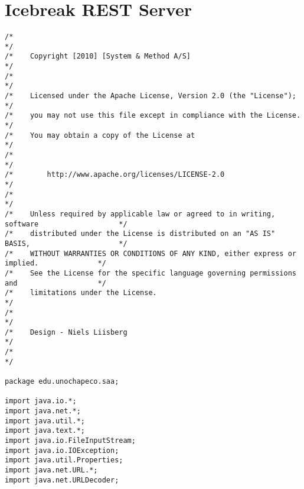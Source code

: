 \chapter{Icebreak REST Server}


\begin{lstlisting}
/*                                                                                          */
/*    Copyright [2010] [System & Method A/S]                                                */
/*                                                                                          */
/*    Licensed under the Apache License, Version 2.0 (the "License");                       */
/*    you may not use this file except in compliance with the License.                      */
/*    You may obtain a copy of the License at                                               */
/*                                                                                          */
/*        http://www.apache.org/licenses/LICENSE-2.0                                        */
/*                                                                                          */
/*    Unless required by applicable law or agreed to in writing, software                   */
/*    distributed under the License is distributed on an "AS IS" BASIS,                     */
/*    WITHOUT WARRANTIES OR CONDITIONS OF ANY KIND, either express or implied.              */
/*    See the License for the specific language governing permissions and                   */
/*    limitations under the License.                                                        */
/*                                                                                          */
/*    Design - Niels Liisberg                                                               */
/*                                                                                          */

package edu.unochapeco.saa;

import java.io.*;
import java.net.*;
import java.util.*;
import java.text.*;
import java.io.FileInputStream;
import java.io.IOException;
import java.util.Properties;
import java.net.URL.*;
import java.net.URLDecoder;


\end{lstlisting}
